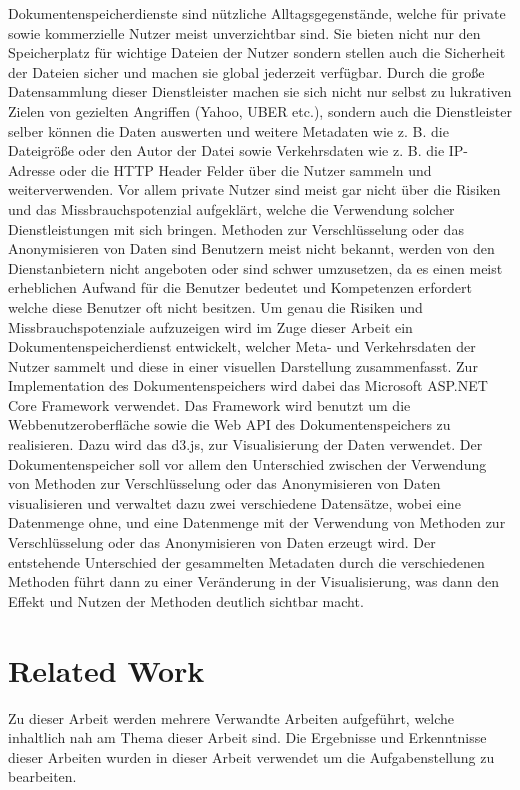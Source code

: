 \documentclass[
    fontsize=12pt,
    headings=small,
    parskip=half,           %
    bibliography=totoc,
    numbers=noenddot,       %
    open=any,               %
    ]{scrreprt}
\begin{document}
Dokumentenspeicherdienste sind nützliche Alltagsgegenstände, welche für private sowie kommerzielle Nutzer meist unverzichtbar sind. 
Sie bieten nicht nur den Speicherplatz für wichtige Dateien der Nutzer sondern stellen auch die Sicherheit der Dateien sicher und machen sie global jederzeit verfügbar. 
Durch die große Datensammlung dieser Dienstleister machen sie sich nicht nur selbst zu lukrativen Zielen von gezielten Angriffen (Yahoo, UBER etc.), sondern auch die Dienstleister selber können die Daten auswerten und weitere Metadaten wie z. B. die Dateigröße oder den Autor der Datei sowie Verkehrsdaten wie z. B. die IP-Adresse oder die \ac{HTTP} Header Felder über die Nutzer sammeln und weiterverwenden. 
Vor allem private Nutzer sind meist gar nicht über die Risiken und das Missbrauchspotenzial aufgeklärt, welche die Verwendung solcher Dienstleistungen mit sich bringen. 
Methoden zur Verschlüsselung oder das Anonymisieren von Daten sind Benutzern meist nicht bekannt, werden von den Dienstanbietern nicht angeboten oder sind schwer umzusetzen, da es einen meist erheblichen Aufwand für die Benutzer bedeutet und Kompetenzen erfordert welche diese Benutzer oft nicht besitzen. 
Um genau die Risiken und Missbrauchspotenziale aufzuzeigen wird im Zuge dieser Arbeit ein Dokumentenspeicherdienst entwickelt, welcher Meta- und Verkehrsdaten der Nutzer sammelt und diese in einer visuellen Darstellung zusammenfasst. 
Zur Implementation des Dokumentenspeichers wird dabei das Microsoft ASP.NET Core Framework verwendet. 
Das Framework wird benutzt um die Webbenutzeroberfläche sowie die Web \ac{API} des Dokumentenspeichers zu realisieren. 
Dazu wird das \ac{d3.js}, zur Visualisierung der Daten verwendet. 
Der Dokumentenspeicher soll vor allem den Unterschied zwischen der Verwendung von Methoden zur Verschlüsselung oder das Anonymisieren von Daten visualisieren und verwaltet dazu zwei verschiedene Datensätze, wobei eine Datenmenge ohne, und eine Datenmenge mit der Verwendung von Methoden zur Verschlüsselung oder das Anonymisieren von Daten erzeugt wird. Der entstehende Unterschied der gesammelten Metadaten durch die verschiedenen Methoden führt dann zu einer Veränderung in der Visualisierung, was dann den Effekt und Nutzen der Methoden deutlich sichtbar macht.  
\section{Related Work}
Zu dieser Arbeit werden mehrere Verwandte Arbeiten aufgeführt, welche inhaltlich nah am Thema dieser Arbeit sind.
Die Ergebnisse und Erkenntnisse dieser Arbeiten wurden in dieser Arbeit verwendet um die Aufgabenstellung zu bearbeiten.
\end{document}
